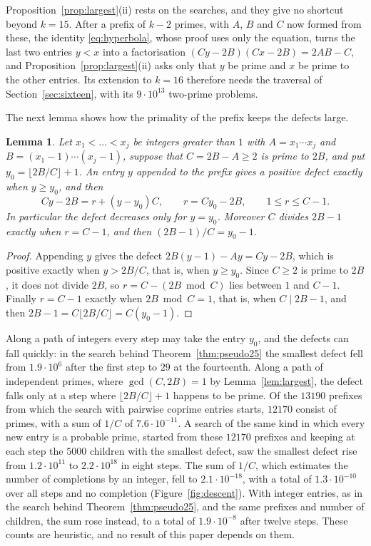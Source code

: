 \documentclass[11pt,reqno]{amsart}
\numberwithin{equation}{section}
\theoremstyle{plain}
\newtheorem{lemma}[theorem]{Lemma}
\theoremstyle{definition}
\theoremstyle{remark}
\begin{document}
Proposition~\ref{prop:largest}(ii) rests on the searches, and they give
no shortcut beyond $k=15$. After a prefix of $k-2$ primes, with $A$, $B$
and $C$ now formed from these, the identity \eqref{eq:hyperbola}, whose
proof uses only the equation, turns the last two entries $y<x$ into a
factorisation $(Cy-2B)(Cx-2B)=2AB-C$, and
Proposition~\ref{prop:largest}(ii) asks only that $y$ be prime and $x$
be prime to the other entries. Its extension to $k=16$ therefore needs
the traversal of Section~\ref{sec:sixteen}, with its
$9\cdot10^{13}$ two-prime problems.

The next lemma shows how the primality of the prefix keeps the
defects large.

\begin{lemma}\label{lem:defect}
Let $x_1<\dots<x_j$ be integers greater than $1$ with
$A=x_1\cdots x_j$ and $B=(x_1-1)\cdots(x_j-1)$, suppose that
$C=2B-A\ge2$ is prime to $2B$, and put $y_0=\lfloor2B/C\rfloor+1$. An
entry $y$ appended to the prefix gives a positive defect exactly when
$y\ge y_0$, and then
\[
  Cy-2B=r+(y-y_0)C,\qquad r=Cy_0-2B,\qquad 1\le r\le C-1 .
\]
In particular the defect decreases only for $y=y_0$. Moreover $C$
divides $2B-1$ exactly when $r=C-1$, and then $(2B-1)/C=y_0-1$.
\end{lemma}

\begin{proof}
Appending $y$ gives the defect $2B(y-1)-Ay=Cy-2B$, which is positive
exactly when $y>2B/C$, that is, when $y\ge y_0$. Since $C\ge2$ is prime
to $2B$, it does not divide $2B$, so $r=C-(2B\bmod C)$ lies between $1$
and $C-1$. Finally $r=C-1$ exactly when $2B\bmod C=1$, that is, when
$C\mid2B-1$, and then $2B-1=C\lfloor2B/C\rfloor=C(y_0-1)$.
\end{proof}

Along a path of integers every step may take the entry $y_0$, and the
defects can fall quickly: in the search behind
Theorem~\ref{thm:pseudo25} the smallest defect fell from
$1.9\cdot10^6$ after the first step to $29$ at the fourteenth. Along a
path of independent primes, where $\gcd(C,2B)=1$ by
Lemma~\ref{lem:largest}, the defect falls only at a step where
$\lfloor2B/C\rfloor+1$ happens to be prime. Of the $13190$ prefixes
from which the search with pairwise coprime entries starts, $12170$
consist of primes, with a sum of $1/C$ of $7.6\cdot10^{-11}$. A search
of the same kind in which every new entry is a probable prime, started
from these
$12170$ prefixes and keeping at each step the $5000$ children with the
smallest defect, saw the smallest defect rise from $1.2\cdot10^{11}$ to
$2.2\cdot10^{18}$ in eight steps. The sum of $1/C$, which estimates the
number of completions by an integer, fell to $2.1\cdot10^{-18}$, with a
total of $1.3\cdot10^{-10}$ over all steps and no completion
(Figure~\ref{fig:descent}). With integer entries, as in the search
behind Theorem~\ref{thm:pseudo25}, and the same prefixes and number of
children, the sum rose instead, to a total of $1.9\cdot10^{-8}$ after
twelve steps. These counts are heuristic, and no result of this
paper depends on them.
\end{document}
